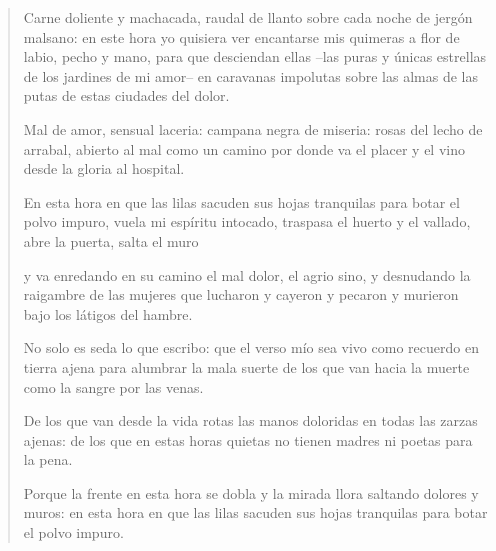 \documentclass[12pt]{article}
\begin{document}
\clearpage
{}
\begin{verse}
Carne doliente y machacada,  
raudal de llanto sobre cada  
noche de jergón malsano:  
en este hora yo quisiera  
ver encantarse mis quimeras  
a flor de labio, pecho y mano,  
para que desciendan ellas  
--las puras y únicas estrellas  
de los jardines de mi amor--  
en caravanas impolutas  
sobre las almas de las putas  
de estas ciudades del dolor.  
  
Mal de amor, sensual laceria:  
campana negra de miseria:  
rosas del lecho de arrabal,  
abierto al mal como un camino  
por donde va el placer y el vino  
desde la gloria al hospital.  
  
En esta hora en que las lilas  
sacuden sus hojas tranquilas  
para botar el polvo impuro,  
vuela mi espíritu intocado,  
traspasa el huerto y el vallado,  
abre la puerta, salta el muro  
  
y va enredando en su camino  
el mal dolor, el agrio sino,  
y desnudando la raigambre  
de las mujeres que lucharon  
y cayeron  
y pecaron  
y murieron  
bajo los látigos del hambre.  
  
No solo es seda lo que escribo:  
que el verso mío sea vivo  
como recuerdo en tierra ajena  
para alumbrar la mala suerte  
de los que van hacia la muerte  
como la sangre por las venas.  
  
De los que van desde la vida  
rotas las manos doloridas  
en todas las zarzas ajenas:  
de los que en estas horas quietas  
no tienen madres ni poetas  
para la pena.  
  
Porque la frente en esta hora  
se dobla y la mirada llora  
saltando dolores y muros:  
en esta hora en que las lilas  
sacuden sus hojas tranquilas  
para botar el polvo impuro.

\end{verse}
\end{document}
